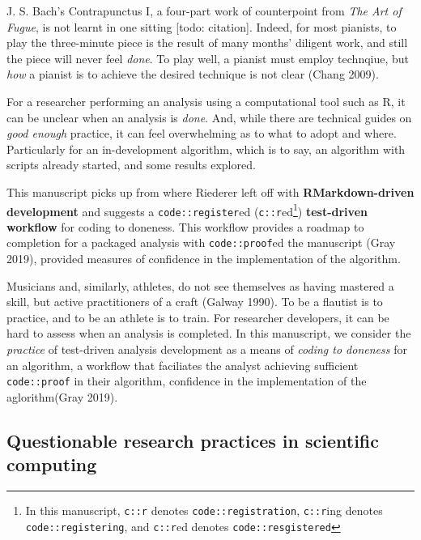 \documentclass[
]{article}
\begin{document}
J. S. Bach's Contrapunctus I, a four-part work of counterpoint from
\emph{The Art of Fugue}, is not learnt in one sitting {[}todo:
citation{]}. Indeed, for most pianists, to play the three-minute piece
is the result of many months' diligent work, and still the piece will
never feel \emph{done}. To play well, a pianist must employ technqiue,
but \emph{how} a pianist is to achieve the desired technique is not
clear (Chang 2009).

For a researcher performing an analysis using a computational tool such
as R, it can be unclear when an analysis is \emph{done}. And, while
there are technical guides on \emph{good enough} practice, it can feel
overwhelming as to what to adopt and where. Particularly for an
in-development algorithm, which is to say, an algorithm with scripts
already started, and some results explored.

This manuscript picks up from where Riederer left off with
\textbf{RMarkdown-driven development} and suggests a
\texttt{code::register}ed (\texttt{c::r}ed\footnote{In this manuscript,
  \texttt{c::r} denotes \texttt{code::registration}, \texttt{c::r}ing
  denotes \texttt{code::registering}, and \texttt{c::r}ed denotes
  \texttt{code::resgistered}}) \textbf{test-driven workflow} for coding
to doneness. This workflow provides a roadmap to completion for a
packaged analysis with \texttt{code::proof}ed the manuscript (Gray
2019), provided measures of confidence in the implementation of the
algorithm.

Musicians and, similarly, athletes, do not see themselves as having
mastered a skill, but active practitioners of a craft (Galway 1990). To
be a flautist is to practice, and to be an athlete is to train. For
researcher developers, it can be hard to assess when an analysis is
completed. In this manuscript, we consider the \emph{practice} of
test-driven analysis development as a means of \emph{coding to doneness}
for an algorithm, a workflow that faciliates the analyst achieving
sufficient \texttt{code::proof} in their algorithm, confidence in the
implementation of the aglorithm(Gray 2019).

\hypertarget{questionable-research-practices-in-scientific-computing}{%
\subsection{Questionable research practices in scientific
computing}\label{questionable-research-practices-in-scientific-computing}}
\end{document}
